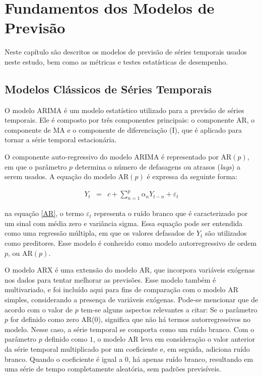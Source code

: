 \section{Fundamentos dos Modelos de Previs\~ao}\label{sec:base}

 Neste capítulo são descritos os modelos de previsão de séries temporais usados neste estudo, bem como as métricas e testes estatísticas de desempenho. 
 
 \subsection{Modelos Cl\'assicos de S\'eries Temporais}\label{subsec:arima}

O modelo ARIMA é um modelo estatístico utilizado para a previsão de séries temporais. Ele é composto por três componentes principais: o componente AR, o componente de MA e o componente de diferenciação (I), que é aplicado para tornar a série temporal estacionária. 

O componente auto-regressivo do modelo ARIMA é representado por AR$(p)$, em que o parâmetro $p$ determina o número de defasagens ou atrasos (\textit{lags}) a serem usados. A equação do modelo AR$(p)$ é expressa da seguinte forma:
 
 \begin{eqnarray}
 	Y_t&=&c+\sum_{n=1}^{p} \alpha_n Y_{t-n} + \varepsilon_t\label{AR}
 \end{eqnarray}
 
\noindent na equação \eqref{AR}, o termo $\varepsilon_t$ representa o ruído branco que é caracterizado por um sinal com média zero e variância sigma. Essa equação pode ser entendida como uma regressão múltipla, em que os valores defasados de $Y_t$ são utilizados como preditores. Esse modelo é conhecido como modelo autorregressivo de ordem $p$, ou AR$(p)$.
 
O modelo ARX é uma extensão do modelo AR, que incorpora variáveis exógenas nos dados para tentar melhorar as previsões. Esse modelo também é multivariado, e foi incluído aqui para fins de comparação com o modelo AR simples, considerando a presença de variáveis exógenas. Pode-se mencionar que de acordo com o valor de $p$ tem-se alguns aspectos relevantes a citar:
 Se o parâmetro $p$ for definido como zero AR($0$), significa que não há termos autorregressivos no modelo. Nesse caso, a série temporal se comporta como um ruído branco. Com o parâmetro $p$ definido como $1$, o modelo AR leva em consideração o valor anterior da série temporal multiplicado por um coeficiente e, em seguida, adiciona ruído branco. Quando o coeficiente é igual a $0$, há apenas ruído branco, resultando em uma série de tempo completamente aleatória, sem padrões previsíveis. 
 
